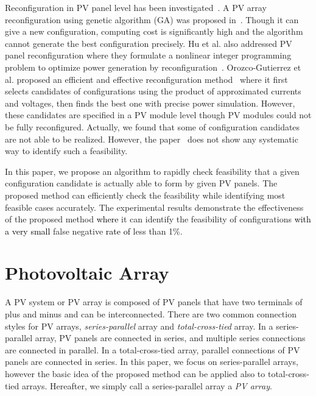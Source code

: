 \documentclass[conference]{pvsctran}
\newcommand{\michiko}{\textcolor{black}}
\begin{document}
Reconfiguration in PV panel level has been investigated~\cite{carotenuto2015evolutionary,hu2017non,orozco2016optimized}. 
A PV array reconfiguration using genetic algorithm (GA) was proposed in~\cite{carotenuto2015evolutionary}. Though it can give a new configuration, computing cost is significantly high and the algorithm cannot generate the best configuration precisely.  
Hu et al. also addressed PV panel reconfiguration where they formulate a nonlinear integer programming problem to optimize power generation by reconfiguration~\cite{hu2017non}.
Orozco-Gutierrez et al. proposed an efficient and effective reconfiguration method~\cite{orozco2016optimized} where it first selects candidates of configurations using the product of approximated currents and voltages,
then finds the best one with precise power simulation. 
However, these candidates are specified in a PV module level though PV modules could not be fully reconfigured. Actually, we found that some of configuration candidates are not able to be realized. However, the paper~\cite{orozco2016optimized}  does not show any systematic way to identify such a feasibility. 

In this paper, we propose an algorithm to rapidly check feasibility that a given configuration candidate is actually able to form by given PV panels. 
The proposed method can efficiently check the feasibility while identifying most feasible cases accurately. 
The experimental results demonstrate the effectiveness of the proposed method \michiko{where} it can identify the feasibility of configurations \michiko{with a very small}   false negative \michiko{rate of} less than 1\%.


\section{Photovoltaic Array}\label{Sec2}

A PV system or PV array is composed of PV panels that have two terminals of plus and minus and can be interconnected.
There are two common connection styles for PV arrays, \textit{series-parallel} array and \textit{total-cross-tied} array. 
In a series-parallel array, PV panels are connected in series, and multiple series connections are connected in parallel. 
In a total-cross-tied array, parallel connections of PV panels are connected in series. 
In this paper, we focus on series-parallel arrays, however the basic idea of the proposed method can be applied also to total-cross-tied arrays. 
Hereafter, we simply call a series-parallel array a \textit{PV array}. 
\end{document}
